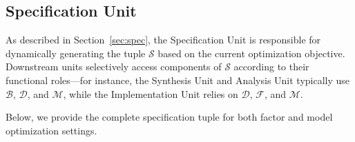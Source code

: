 \documentclass{article}
\begin{document}
\subsection{Specification Unit} \label{app_pdsu}
As described in Section~\ref{sec:spec}, the Specification Unit is responsible for dynamically generating the tuple $\mathcal{S}$ based on the current optimization objective. Downstream units selectively access components of $\mathcal{S}$ according to their functional roles—for instance, the Synthesis Unit and Analysis Unit typically use $\mathcal{B}$, $\mathcal{D}$, and $\mathcal{M}$, while the Implementation Unit relies on $\mathcal{D}$, $\mathcal{F}$, and $\mathcal{M}$.

Below, we provide the complete specification tuple for both factor and model optimization settings.
\end{document}
